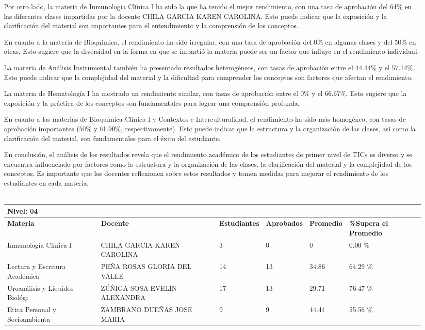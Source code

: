 Por otro lado, la materia de Inmunología Clínica I ha sido la que ha tenido el mejor rendimiento, con una tasa de aprobación del 64\% en las diferentes clases impartidas por la docente CHILA GARCIA KAREN CAROLINA. Esto puede indicar que la exposición y la clarificación del material son importantes para el entendimiento y la comprensión de los conceptos.

En cuanto a la materia de Bioquímica, el rendimiento ha sido irregular, con una tasa de aprobación del 0\% en algunas clases y del 50\% en otras. Esto sugiere que la diversidad en la forma en que se impartió la materia puede ser un factor que influye en el rendimiento individual.

La materia de Análisis Instrumental también ha presentado resultados heterogéneos, con tasas de aprobación entre el 44.44\% y el 57.14\%. Esto puede indicar que la complejidad del material y la dificultad para comprender los conceptos son factores que afectan el rendimiento.

La materia de Hematología I ha mostrado un rendimiento similar, con tasas de aprobación entre el 0\% y el 66.67\%. Esto sugiere que la exposición y la práctica de los conceptos son fundamentales para lograr una comprensión profunda.

En cuanto a las materias de Bioquímica Clínica I y Contextos e Interculturalidad, el rendimiento ha sido más homogéneo, con tasas de aprobación importantes (50\% y 61.90\%, respectivamente). Esto puede indicar que la estructura y la organización de las clases, así como la clarificación del material, son fundamentales para el éxito del estudiante.

En conclusión, el análisis de los resultados revela que el rendimiento académico de los estudiantes de primer nivel de TICs es diverso y se encuentra influenciado por factores como la estructura y la organización de las clases, la clarificación del material y la complejidad de los conceptos. Es importante que los docentes reflexionen sobre estos resultados y tomen medidas para mejorar el rendimiento de los estudiantes en cada materia.\\
\vspace{1cm}\\\small
\begin{tabularx}{\textwidth}{|p{2.5cm}|p{2.5cm}|X|X|X|X|}
\hline
\multicolumn{6}{|X|}{\textbf{Nivel: 04 }}\\\hline\textbf{Materia} & \textbf{Docente} & \textbf{Estudiantes} & \textbf{Aprobados} & \textbf{Promedio} & \textbf{\%Supera el Promedio} \\ \hline
Inmunología Clínica I & CHILA GARCIA KAREN CAROLINA & 3 & 0 & 0 & 0.00 \%\\ \hline
Lectura y Escritura Académica & PEÑA ROSAS GLORIA DEL VALLE & 14 & 13 & 34.86 & 64.29 \%\\ \hline
Uroanálisis y Líquidos Biológi & ZÚÑIGA SOSA EVELIN ALEXANDRA & 17 & 13 & 29.71 & 76.47 \%\\ \hline
Etica Personal y Socioambienta & ZAMBRANO DUEÑAS JOSE MARIA & 9 & 9 & 44.44 & 55.56 \%\\ \hline
\end{tabularx}

